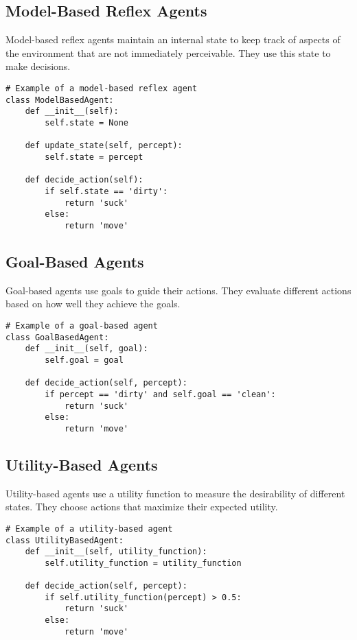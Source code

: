 \subsection{Model-Based Reflex Agents}
Model-based reflex agents maintain an internal state to keep track of aspects of the environment that are not immediately perceivable. They use this state to make decisions.

\begin{verbatim}
# Example of a model-based reflex agent
class ModelBasedAgent:
    def __init__(self):
        self.state = None
    
    def update_state(self, percept):
        self.state = percept
    
    def decide_action(self):
        if self.state == 'dirty':
            return 'suck'
        else:
            return 'move'
\end{verbatim}

\subsection{Goal-Based Agents}
Goal-based agents use goals to guide their actions. They evaluate different actions based on how well they achieve the goals.

\begin{verbatim}
# Example of a goal-based agent
class GoalBasedAgent:
    def __init__(self, goal):
        self.goal = goal
    
    def decide_action(self, percept):
        if percept == 'dirty' and self.goal == 'clean':
            return 'suck'
        else:
            return 'move'
\end{verbatim}

\subsection{Utility-Based Agents}
Utility-based agents use a utility function to measure the desirability of different states. They choose actions that maximize their expected utility.

\begin{verbatim}
# Example of a utility-based agent
class UtilityBasedAgent:
    def __init__(self, utility_function):
        self.utility_function = utility_function
    
    def decide_action(self, percept):
        if self.utility_function(percept) > 0.5:
            return 'suck'
        else:
            return 'move'
\end{verbatim}


